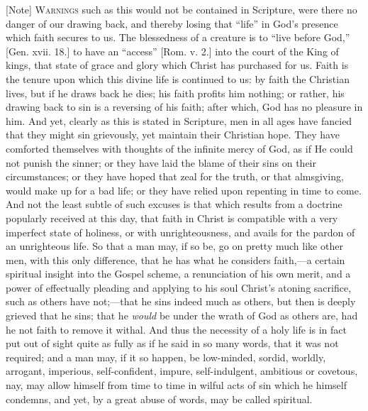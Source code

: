 [Note] W\textsc{arnings} such as this
would not be contained in Scripture, were there no danger of our
drawing back, and thereby losing that ``life'' in God's
presence which faith secures to us. The blessedness of a creature is
to ``live before God,'' [Gen. xvii. 18.] to have an
``access'' [Rom. v. 2.] into the court of the King of kings,
that state of grace and glory which Christ has purchased for us. Faith
is the tenure upon which this divine life is continued to us: by faith
the Christian lives, but if he draws back he dies; his faith profits
him nothing; or rather, his drawing back to sin is a reversing of his
faith; after which, God has no pleasure in him. And yet, clearly as
this is stated in Scripture, men in all ages have fancied that they
might sin grievously, yet maintain their Christian hope. They have
comforted themselves with thoughts of the infinite mercy of God, as if
He could not punish the sinner; or they have laid the blame of their
sins on their circumstances; or they have hoped that zeal for the
truth, or that almsgiving, would make up for a bad life; or they have
relied upon repenting in time to come. And not the least subtle of
such excuses is that which results from a doctrine popularly received
at this day, that faith in Christ is compatible with a very imperfect
state of holiness, or with unrighteousness, and avails for the pardon
of an unrighteous life. So that a man may, if so be, go on pretty much
like other men, with this only difference, that he has what he
considers faith,—a certain spiritual insight into the Gospel scheme,
a renunciation of his own merit, and a power of effectually pleading
and applying to his soul Christ's atoning sacrifice, such as others
have not;—that he sins indeed much as others, but then is deeply
grieved that he sins; that he \emph{would} be under the wrath of God
as others are, had he not faith to remove it withal. And thus the
necessity of a holy life is in fact put out of sight quite as fully as
if he said in so many words, that it was not required; and a man may,
if it so happen, be low-minded, sordid, worldly, arrogant, imperious,
self-confident, impure, self-indulgent, ambitious or covetous, nay,
may allow himself from time to time in wilful acts of sin which he
himself condemns, and yet, by a great abuse of words, may be called
spiritual.

